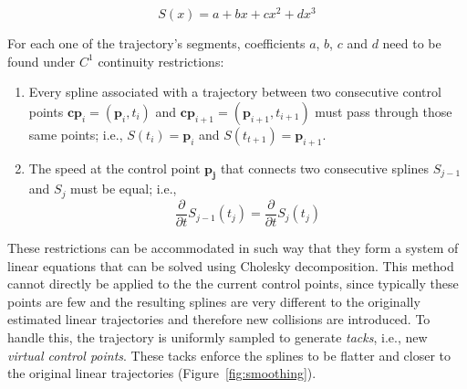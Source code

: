 \begin{equation}
	S(x)=a + bx + cx^2 + dx^3
	\label{eqn:splines}
\end{equation}

For each one of the trajectory's segments, coefficients $a$, $b$, $c$ and $d$ need to be found under $C^1$ continuity restrictions:
\begin{enumerate}
  \item Every spline associated with a trajectory between two consecutive control points $\mathbf{cp}_i=(\mathbf{p}_i,t_i)$ and $\mathbf{cp}_{i + 1}=(\mathbf{p}_{i + 1},t_{i + 1})$ must pass through those same points; i.e., $S(t_i)=\mathbf{p}_i$ and $S(t_{t + 1})=\mathbf{p}_{i + 1}$.
  \item The speed at the control point $\mathbf{p_j}$ that connects two consecutive splines $S_{j - 1}$ and $S_{j}$ must be equal; i.e.,
  \begin{equation}
    		\frac{\partial}{\partial t} S_{j-1}(t_j) = 
  				\frac{\partial}{\partial t} S_{j}(t_j)
  \end{equation}
  
\end{enumerate}
  
These restrictions can be accommodated in such way that they form a system of linear equations that can be solved using Cholesky decomposition.
This method cannot directly be applied to the the current control points, since typically these points are few and the resulting splines are very different to the originally estimated linear trajectories and therefore new collisions are introduced.
To handle this, the trajectory is uniformly sampled to generate \emph{tacks}, i.e., new \emph{virtual control points}.
These tacks enforce the splines to be flatter and closer to the original linear trajectories (Figure~\ref{fig:smoothing}).


